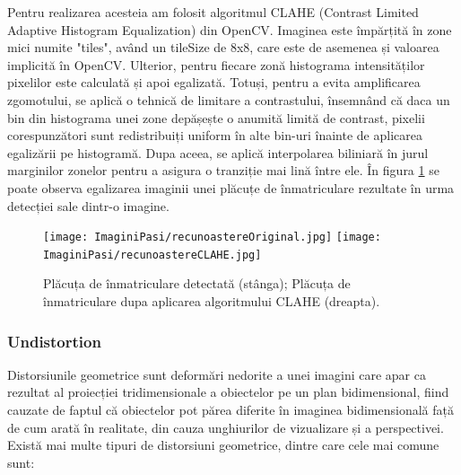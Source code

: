 \documentclass[12pt]{article}
\begin{document}
Pentru realizarea acesteia am folosit algoritmul CLAHE (Contrast Limited Adaptive Histogram Equalization) din OpenCV. Imaginea este \^{i}mp\u{a}rțit\u{a} \^{i}n zone mici numite "tiles", av\^{a}nd un tileSize de 8x8, care este de asemenea și valoarea implicit\u{a} \^{i}n OpenCV. Ulterior, pentru fiecare zon\u{a} histograma intensit\u{a}ților pixelilor este calculat\u{a} și apoi egalizat\u{a}. Totuși, pentru a evita amplificarea zgomotului, se aplic\u{a} o tehnic\u{a} de limitare a contrastului, \^{i}nsemn\^{a}nd c\u{a} daca un bin din histograma unei zone dep\u{a}șește o anumit\u{a} limit\u{a} de contrast, pixelii corespunz\u{a}tori sunt redistribuiți uniform \^{i}n alte bin-uri \^{i}nainte de aplicarea egaliz\u{a}rii pe histogram\u{a}. Dupa aceea, se aplic\u{a} interpolarea biliniar\u{a} \^{i}n jurul marginilor zonelor pentru a asigura o tranziție mai lin\u{a} \^{i}ntre ele. \^{I}n figura \ref{fig:recunoastere_clahe} se poate observa egalizarea imaginii unei pl\u{a}cuțe de \^{i}nmatriculare rezultate \^{i}n urma detecției sale dintr-o imagine.

\begin{figure}[H]
  \centering
  \texttt{[image: ImaginiPasi/recunoastereOriginal.jpg]}\hfill
    \texttt{[image: ImaginiPasi/recunoastereCLAHE.jpg]}
  \caption{Pl\u{a}cuța de \^{i}nmatriculare detectat\u{a} (st\^{a}nga); Pl\u{a}cuța de \^{i}nmatriculare dupa aplicarea algoritmului CLAHE (dreapta).}
  \label{fig:recunoastere_clahe}
\end{figure}

\subsubsection{Undistortion}


Distorsiunile geometrice sunt deform\u{a}ri nedorite a unei imagini care apar ca rezultat al proiecției tridimensionale a obiectelor pe un plan bidimensional, fiind cauzate de faptul c\u{a} obiectelor pot p\u{a}rea diferite \^{i}n imaginea bidimensional\u{a} faț\u{a} de cum arat\u{a} \^{i}n realitate, din cauza unghiurilor de vizualizare și a perspectivei. Exist\u{a} mai multe tipuri de distorsiuni geometrice, dintre care cele mai comune sunt:
\end{document}
